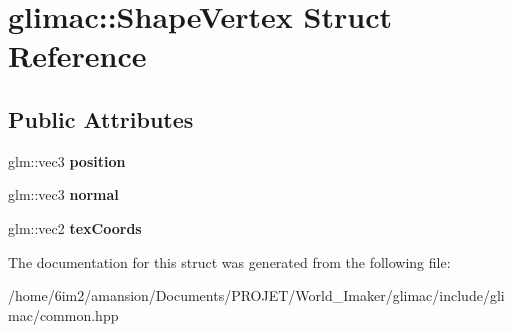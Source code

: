 \hypertarget{structglimac_1_1ShapeVertex}{}\section{glimac\+:\+:Shape\+Vertex Struct Reference}
\label{structglimac_1_1ShapeVertex}
\subsection*{Public Attributes}
\begin{DoxyCompactItemize}
\item 
\mbox{\label{structglimac_1_1ShapeVertex_a727bc4adace4f00e47069ce7373e3b97}} 
glm\+::vec3 {\bfseries position}
\item 
\mbox{\label{structglimac_1_1ShapeVertex_af8ef5c93da6bc86b5dcfa3d8e2a8fc21}} 
glm\+::vec3 {\bfseries normal}
\item 
\mbox{\label{structglimac_1_1ShapeVertex_ab694e76716c4cdc5e8636325b5fbeee2}} 
glm\+::vec2 {\bfseries tex\+Coords}
\end{DoxyCompactItemize}


The documentation for this struct was generated from the following file\+:\begin{DoxyCompactItemize}
\item 
/home/6im2/amansion/\+Documents/\+P\+R\+O\+J\+E\+T/\+World\+\_\+\+Imaker/glimac/include/glimac/common.\+hpp\end{DoxyCompactItemize}
